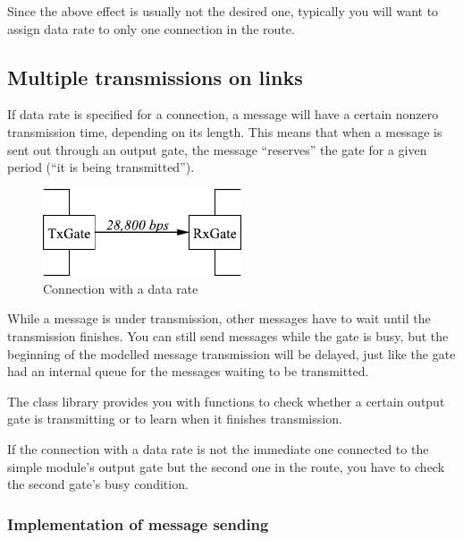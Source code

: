 Since the above effect is usually not the desired one, typically
you will want to assign data rate to only one connection in the
route.



\subsection{Multiple transmissions on links}


If data rate is specified for a connection, a message
will have a certain nonzero transmission time, depending on its length.  This means that when a message is
sent out through an output gate, the message ``reserves'' the gate for
a given period (``it is being transmitted'').

\begin{figure}[htbp]
  \begin{center}
    \includegraphics[width=2.315in, height=1.015in]{figures/usmanFig9}
    \caption{Connection with a data rate}
    \label{fig:ch-simple-modules:conn-w-data-rate}
  \end{center}
\end{figure}

While a message is under transmission, other messages have to wait
until the transmission finishes. You can still send messages
while the gate is busy, but the beginning of the modelled
message transmission will be delayed, just like the gate had
an internal queue for the messages waiting to be transmitted.

The {\opp} class library provides you with functions to check
whether a certain output gate is transmitting or to learn when
it finishes transmission.

If the connection with a data rate is not the immediate one connected
to the simple module's output gate but the second
one in the route, you have to check the second gate's busy
condition.


\subsubsection{Implementation of message sending}


